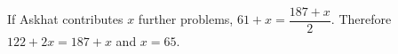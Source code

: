 If Askhat contributes $x$ further problems, $61+x=\dfrac{187+x}{2}$. Therefore $122+2x=187+x$ and $\boxed{x=65}$.
